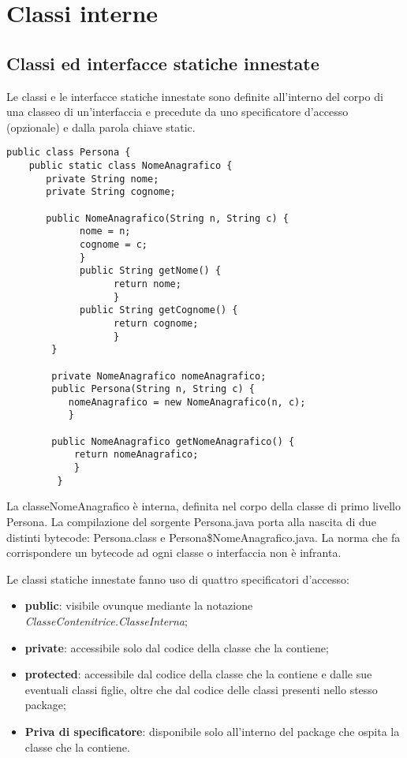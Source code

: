 \section{Classi interne}
\subsection{Classi ed interfacce statiche innestate}
Le classi e le interfacce statiche innestate sono definite all'interno del corpo di una classeo di un'interfaccia e precedute da uno specificatore d'accesso (opzionale) e dalla parola chiave static.
\begin{lstlisting}
public class Persona {  
	public static class NomeAnagrafico { 
	   private String nome;    
	   private String cognome;    

	   public NomeAnagrafico(String n, String c) {
	         nome = n;      
	         cognome = c;    
	         }    
	         public String getNome() {
	               return nome;    
	               }    
	         public String getCognome() {
	               return cognome;    
	               }  
	    }  

	    private NomeAnagrafico nomeAnagrafico;  
	    public Persona(String n, String c) { 
	       nomeAnagrafico = new NomeAnagrafico(n, c);  
	       }  

	    public NomeAnagrafico getNomeAnagrafico() {
	        return nomeAnagrafico;  
	        }
	     }

\end{lstlisting}
La   classeNomeAnagrafico è interna, definita nel corpo della classe di   primo livello Persona. La compilazione del sorgente Persona.java porta alla nascita di due distinti bytecode: Persona.class e Persona\$NomeAnagrafico.java. La norma che fa corrispondere un bytecode ad ogni classe o interfaccia non è infranta.

Le classi statiche innestate fanno uso di quattro specificatori d'accesso:
\begin{itemize}
	\item \textbf{public}:  visibile ovunque mediante la notazione \textit{ClasseContenitrice.ClasseInterna};
	\item \textbf{private}: accessibile solo dal codice della classe che la contiene;
	\item \textbf{protected}: accessibile dal codice della classe che la contiene e dalle sue eventuali classi figlie, oltre che dal codice delle classi presenti nello stesso package;
	\item \textbf{Priva di specificatore}: disponibile solo all'interno del package che ospita la classe che la contiene.
	\end{itemize}
